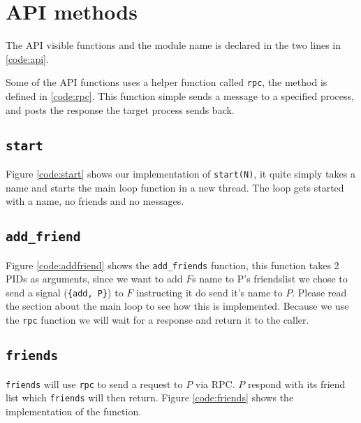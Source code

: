 \section{API methods}

The API visible functions and the module name is declared in the two lines in
\ref{code:api}.


Some of the API functions uses a helper function called \texttt{rpc}, the method
is defined in \ref{code:rpc}. This function simple sends a message to a
specified process, and posts the response the target process sends back.


\subsection{\texttt{start}}
  Figure
\ref{code:start} shows our implementation of \texttt{start(N)}, it quite simply
takes a name and starts the main loop function in a new thread. The loop gets
started with a name, no friends and no messages.

\subsection{\texttt{add\_friend}}

Figure \ref{code:addfriend} shows the \texttt{add\_friends} function, this
function takes 2 PIDs as arguments, since we want to add $F$s name to P's
friendslist we chose to send a signal (\texttt{\{add, P\}}) to $F$ instructing
it do send it's name to $P$. Please read the section about the main loop to see
how this is implemented. Because we use the \texttt{rpc} function we will wait
for a response and return it to the caller.

\subsection{\texttt{friends}}

\texttt{friends} will use \texttt{rpc} to send a request to $P$ via RPC. $P$
respond with its friend list which \texttt{friends} will then return. Figure
\ref{code:friends} shows the implementation of the function.


